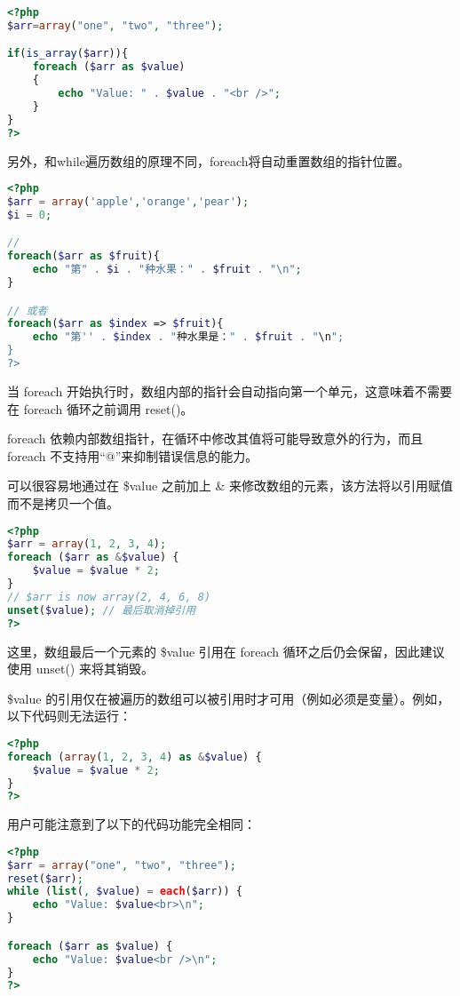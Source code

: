 \begin{lstlisting}[language=PHP]
<?php
$arr=array("one", "two", "three");

if(is_array($arr)){
	foreach ($arr as $value)
	{
		echo "Value: " . $value . "<br />";
	}
}
?>
\end{lstlisting}


另外，和while遍历数组的原理不同，foreach将自动重置数组的指针位置。

\begin{lstlisting}[language=PHP]
<?php
$arr = array('apple','orange','pear');
$i = 0;

// 
foreach($arr as $fruit){
	echo "第" . $i . "种水果：" . $fruit . "\n";
}

// 或者
foreach($arr as $index => $fruit){
	echo "第'' . $index . "种水果是：" . $fruit . "\n";
}
?>
\end{lstlisting}


当 foreach 开始执行时，数组内部的指针会自动指向第一个单元，这意味着不需要在 foreach 循环之前调用 reset()。

foreach 依赖内部数组指针，在循环中修改其值将可能导致意外的行为，而且foreach 不支持用“@”来抑制错误信息的能力。


可以很容易地通过在 \$value 之前加上 \& 来修改数组的元素，该方法将以引用赋值而不是拷贝一个值。


\begin{lstlisting}[language=PHP]
<?php
$arr = array(1, 2, 3, 4);
foreach ($arr as &$value) {
    $value = $value * 2;
}
// $arr is now array(2, 4, 6, 8)
unset($value); // 最后取消掉引用
?>
\end{lstlisting}

这里，数组最后一个元素的 \$value 引用在 foreach 循环之后仍会保留，因此建议使用 unset() 来将其销毁。

\$value 的引用仅在被遍历的数组可以被引用时才可用（例如必须是变量）。例如，以下代码则无法运行：


\begin{lstlisting}[language=PHP]
<?php
foreach (array(1, 2, 3, 4) as &$value) {
    $value = $value * 2;
}
?>
\end{lstlisting}



用户可能注意到了以下的代码功能完全相同：

\begin{lstlisting}[language=PHP]
<?php
$arr = array("one", "two", "three");
reset($arr);
while (list(, $value) = each($arr)) {
    echo "Value: $value<br>\n";
}

foreach ($arr as $value) {
    echo "Value: $value<br />\n";
}
?>
\end{lstlisting}

